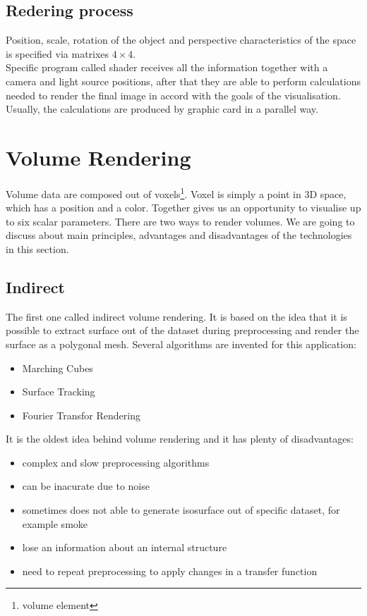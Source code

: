\documentclass[twoside, english, 11pt]{report}
\begin{document}
\subsection{Redering process}
Position, scale, rotation of the object and perspective characteristics of the space is specified via matrixes $4\times4$.\\


Specific program called shader receives all the information together with a camera and light source positions, after that they are able to perform calculations needed to render the final image in accord with the goals of the visualisation. Usually, the calculations are produced by graphic card in a parallel way.

\section{Volume Rendering}

Volume data are composed out of voxels\footnote{volume element}. Voxel is simply a point in 3D space, which has a position and a color. Together gives us an opportunity to visualise up to six scalar parameters. There are two ways to render volumes. We are going to discuss about main principles, advantages and disadvantages of the technologies in this section.\\

\subsection{Indirect}

The first one called indirect volume rendering. It is based on the idea that it is possible to extract surface out of the dataset during preprocessing and render the surface as a polygonal mesh. Several algorithms are invented for this application:
\begin{itemize}
\item Marching Cubes
\item Surface Tracking
\item Fourier Transfor Rendering
\end{itemize}
It is the oldest idea behind volume rendering and it has plenty of disadvantages:
\begin{itemize}
\item complex and slow preprocessing algorithms
\item can be inacurate due to noise
\item sometimes does not able to generate isosurface out of specific dataset, for example smoke
\item lose an information about an internal structure
\item need to repeat preprocessing to apply changes in a transfer function
\end{itemize}
\end{document}
